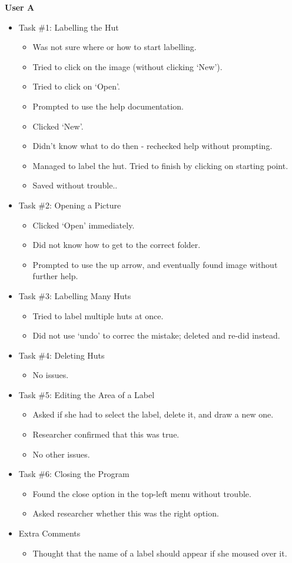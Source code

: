 \documentclass[11pt,twocolumn]{article}
\begin{document}
\textbf{User A}
\begin{itemize}
\item Task \#1: Labelling the Hut
\begin{itemize}
\item Was not sure where or how to start labelling.
\item Tried to click on the image (without clicking `New').
\item Tried to click on `Open'.
\item Prompted to use the help documentation. 
\item Clicked `New'.
\item Didn't know what to do then - rechecked help without prompting.
\item Managed to label the hut. Tried to finish by clicking on starting point.
\item Saved without trouble.. 
\end{itemize}
\item Task \#2: Opening a Picture
\begin{itemize}
\item Clicked `Open' immediately. 
\item Did not know how to get to the correct folder. 
\item Prompted to use the up arrow, and eventually found image without further help. 
\end{itemize}
\item Task \#3: Labelling Many Huts
\begin{itemize}
\item Tried to label multiple huts at once.
\item Did not use `undo' to correc the mistake; deleted and re-did instead.
\end{itemize}
\item Task \#4: Deleting Huts
\begin{itemize}
\item No issues.
\end{itemize}
\item Task \#5: Editing the Area of a Label
\begin{itemize}
\item Asked if she had to select the label, delete it, and draw a new one.
\item Researcher confirmed that this was true.
\item No other issues.
\end{itemize}
\item Task \#6: Closing the Program
\begin{itemize}
\item Found the close option in the top-left menu without trouble.
\item Asked researcher whether this was the right option.
\end{itemize}
\item Extra Comments
\begin{itemize}
\item Thought that the name of a label should appear if she moused over it.
\end{itemize}
\end{itemize}
\end{document}
